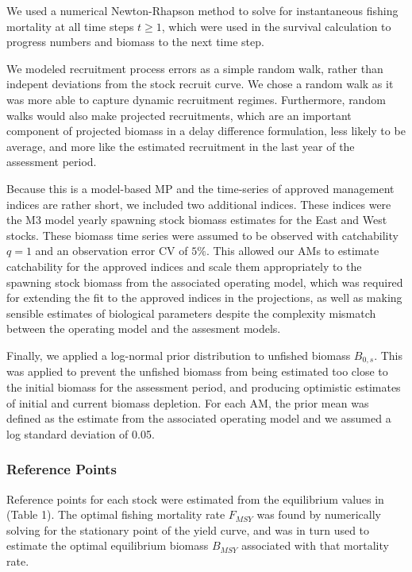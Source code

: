 \documentclass[]{article}
\begin{document}
We used a numerical Newton-Rhapson method to solve for instantaneous
fishing mortality at all time steps \(t \geq 1\), which were used in
the survival calculation to progress numbers and biomass to the
next time step.

We modeled recruitment process errors as a simple random
walk, rather than indepent deviations from the stock recruit curve.
We chose a random walk as it was more able to capture dynamic
recruitment regimes. Furthermore, random walks would also make
projected recruitments, which are an important component of
projected biomass in a delay difference formulation, less
likely to be average, and more like the estimated
recruitment in the last year of the assessment period.

Because this is a model-based MP and the time-series of approved
management indices are rather short, we included two additional indices.
These indices were the M3 model yearly spawning stock biomass estimates
for the East and West stocks. These biomass time series were assumed to be
observed with catchability \(q = 1\) and an observation error
CV of \(5 \%\). This allowed our AMs to estimate catchability for the
approved indices and scale them appropriately to the spawning stock biomass
from the associated operating model, which was required for extending the
fit to the approved indices in the projections, as well as making sensible
estimates of biological parameters despite the complexity mismatch between
the operating model and the assesment models.

Finally, we applied a log-normal prior distribution to unfished
biomass \(B_{0,s}\). This was applied to prevent the unfished biomass from
being estimated too close to the initial biomass for the assessment period,
and producing optimistic estimates of initial and current biomass
depletion. For each AM, the prior mean was defined as the estimate from the
associated operating model and we assumed a log standard deviation of 0.05.

\hypertarget{reference-points}{%
\subsubsection{Reference Points}\label{reference-points}}

Reference points for each stock were estimated from the equilibrium
values in (Table 1). The optimal fishing mortality rate \(F_{MSY}\)
was found by numerically solving for the stationary point of the yield
curve, and was in turn used to estimate the optimal equilibrium
biomass \(B_{MSY}\) associated with that mortality rate.
\end{document}
